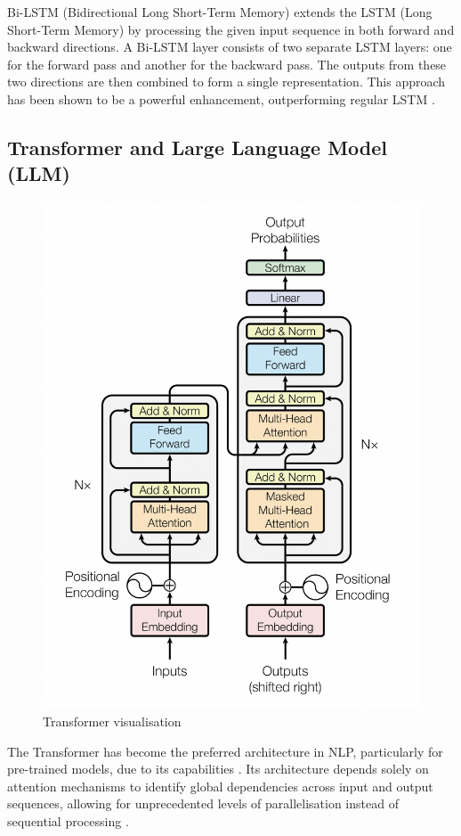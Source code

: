 Bi-LSTM (Bidirectional Long Short-Term Memory) extends the LSTM (Long Short-Term Memory) by processing the given input sequence in both forward and backward directions. A Bi-LSTM layer consists of two separate LSTM layers: one for the forward pass and another for the backward pass. The outputs from these two directions are then combined to form a single representation. This approach has been shown to be a powerful enhancement, outperforming regular LSTM \cite{graves-2005-bilstm}.

\subsection{Transformer and Large Language Model (LLM)}

\begin{figure}[htbp]
    \centering
    \includegraphics[width=0.65\linewidth]{images/transformer.png}
    \caption{Transformer visualisation \cite{vaswani-2023-attention}}
    \label{fig:transformer}
\end{figure}

The Transformer has become the preferred architecture in NLP, particularly for pre-trained models, due to its capabilities \cite{lin-2022-survey-transformers}. Its architecture depends solely on attention mechanisms to identify global dependencies across input and output sequences, allowing for unprecedented levels of parallelisation instead of sequential processing \cite{vaswani-2023-attention}.

